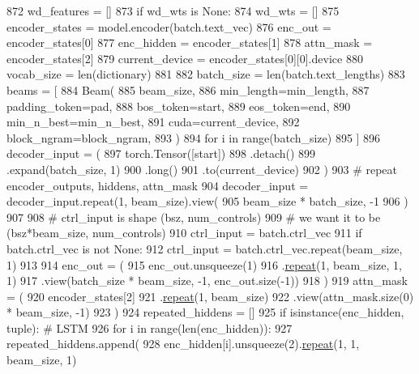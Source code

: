 \begin{DoxyCode}
872             wd\_features = []
873         \textcolor{keywordflow}{if} wd\_wts \textcolor{keywordflow}{is} \textcolor{keywordtype}{None}:
874             wd\_wts = []
875         encoder\_states = model.encoder(batch.text\_vec)
876         enc\_out = encoder\_states[0]
877         enc\_hidden = encoder\_states[1]
878         attn\_mask = encoder\_states[2]
879         current\_device = encoder\_states[0][0].device
880         vocab\_size = len(dictionary)
881 
882         batch\_size = len(batch.text\_lengths)
883         beams = [
884             Beam(
885                 beam\_size,
886                 min\_length=min\_length,
887                 padding\_token=pad,
888                 bos\_token=start,
889                 eos\_token=end,
890                 min\_n\_best=min\_n\_best,
891                 cuda=current\_device,
892                 block\_ngram=block\_ngram,
893             )
894             \textcolor{keywordflow}{for} i \textcolor{keywordflow}{in} range(batch\_size)
895         ]
896         decoder\_input = (
897             torch.Tensor([start])
898             .detach()
899             .expand(batch\_size, 1)
900             .long()
901             .to(current\_device)
902         )
903         \textcolor{comment}{# repeat encoder\_outputs, hiddens, attn\_mask}
904         decoder\_input = decoder\_input.repeat(1, beam\_size).view(
905             beam\_size * batch\_size, -1
906         )
907 
908         \textcolor{comment}{# ctrl\_input is shape (bsz, num\_controls)}
909         \textcolor{comment}{# we want it to be (bsz*beam\_size, num\_controls)}
910         ctrl\_input = batch.ctrl\_vec
911         \textcolor{keywordflow}{if} batch.ctrl\_vec \textcolor{keywordflow}{is} \textcolor{keywordflow}{not} \textcolor{keywordtype}{None}:
912             ctrl\_input = batch.ctrl\_vec.repeat(beam\_size, 1)
913 
914         enc\_out = (
915             enc\_out.unsqueeze(1)
916             .\hyperlink{namespacerepeat}{repeat}(1, beam\_size, 1, 1)
917             .view(batch\_size * beam\_size, -1, enc\_out.size(-1))
918         )
919         attn\_mask = (
920             encoder\_states[2]
921             .\hyperlink{namespacerepeat}{repeat}(1, beam\_size)
922             .view(attn\_mask.size(0) * beam\_size, -1)
923         )
924         repeated\_hiddens = []
925         \textcolor{keywordflow}{if} isinstance(enc\_hidden, tuple):  \textcolor{comment}{# LSTM}
926             \textcolor{keywordflow}{for} i \textcolor{keywordflow}{in} range(len(enc\_hidden)):
927                 repeated\_hiddens.append(
928                     enc\_hidden[i].unsqueeze(2).\hyperlink{namespacerepeat}{repeat}(1, 1, beam\_size, 1)

\end{DoxyCode}
